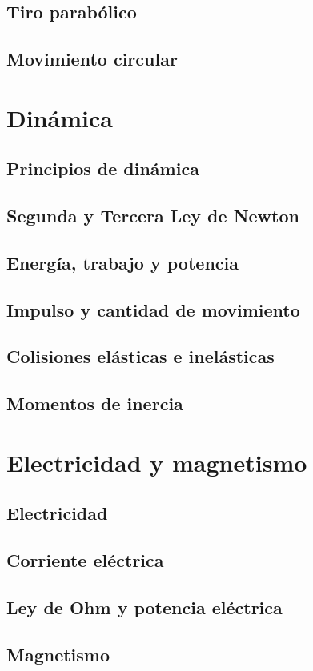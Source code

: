 \documentclass{../Resume}
\begin{document}
    \chapter{Tiro parabólico}
    \chapter{Movimiento circular}

\part{Dinámica}

    \chapter{Principios de dinámica}
    \chapter{Segunda y Tercera Ley de Newton}
    \chapter{Energía, trabajo y potencia}
    \chapter{Impulso y cantidad de movimiento}
    \chapter{Colisiones elásticas e inelásticas}
    \chapter{Momentos de inercia}

\part{Electricidad y magnetismo}

    \chapter{Electricidad}
    \chapter{Corriente eléctrica}
    \chapter{Ley de Ohm y potencia eléctrica}
    \chapter{Magnetismo}


\newpage


\end{document}
